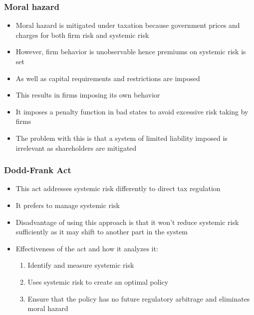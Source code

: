 \documentclass[11pt]{beamer}
\begin{document}

\begin{frame}
\frametitle{Moral hazard}
\begin{itemize}\itemsep10pt
\item Moral hazard is mitigated under taxation because government prices and charges for both firm risk and systemic risk
\item However, firm behavior is unobservable hence premiums on systemic risk is set
\item As well as capital requirements and restrictions are imposed
\item This results in firms imposing its own behavior
\item It imposes a penalty function in bad states to avoid excessive risk taking by firms
\item The problem with this is that a system of limited liability imposed is irrelevant as shareholders are mitigated
\end{itemize}
\end{frame}


\begin{frame}
\frametitle{Dodd-Frank Act}
\begin{itemize}\itemsep10pt
\item This act addresses systemic risk differently to direct tax regulation
\item It prefers to manage systemic risk
\item Disadvantage of using this approach is that it won't reduce systemic risk sufficiently as it may shift to another part in the system
\item Effectiveness of the act and how it analyzes it:
\begin{enumerate}\itemsep5pt
\item Identify and measure systemic risk
\item Uses systemic risk to create an optimal policy
\item Ensure that the policy has no future regulatory arbitrage and eliminates moral hazard
\end{enumerate}
\end{itemize}
\end{frame}

\end{document}
